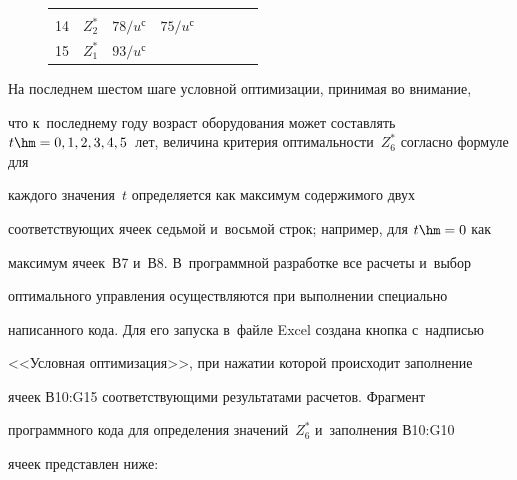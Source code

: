 \begin{figure}[b]
{\begin{center}
\begin{tabular}{|c|c|c|c|c|c|c|c|}
& &\\


\cellcolor[gray]{.9}14&$Z^*_2$&$78/ u^{\mathrm{с}}$&$75/u^{\mathrm{с}}$& & & &\\


\cellcolor[gray]{.9}15&$Z^*_1$&$93/ u^{\mathrm{с}}$& & & & &\\


\hline


\end{tabular}


\end{center}


}


\vspace*{-6pt}







\end{figure}


  


  На последнем шестом шаге условной оптимизации, принимая во внимание, 


что к~последнему году возраст оборудования может со\-став\-лять $t \hm= 0, 1, 2, 


3, 4, 5$~лет, величина критерия оптимальности~$Z_6^*$ согласно формуле для 


каждого значения~$t$ определяется как максимум содержимого двух 


со\-от\-вет\-ст\-ву\-ющих ячеек седьмой и~восьмой строк; например, для $t \hm= 0$ как 


максимум ячеек~В7 и~В8. В~про\-грам\-мной разработке все расчеты и~выбор 


оптимального управ\-ле\-ния осуществляются при выполнении специально 


написанного кода. Для его запуска в~файле Excel создана кнопка с~надписью 


<<Условная оптимизация>>, при нажатии которой происходит заполнение 


ячеек В10:G15 со\-от\-вет\-ст\-ву\-ющи\-ми результатами расчетов. Фрагмент 


программного кода для определения значений~$Z_6^*$ и~заполнения В10:G10 




ячеек пред\-став\-лен ниже:





